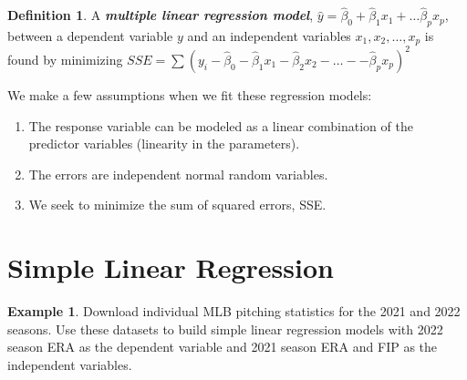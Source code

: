 \documentclass[
  11pt,
]{book}
\providecommand{\tightlist}{%
  \setlength{\itemsep}{0pt}\setlength{\parskip}{0pt}}
\theoremstyle{definition}
\newtheorem{definition}{Definition}[chapter]
\theoremstyle{definition}
\newtheorem{example}{Example}[chapter]
\theoremstyle{definition}
\theoremstyle{definition}
\theoremstyle{remark}
\begin{document}
\begin{definition}
A \textbf{\emph{multiple linear regression model}}, \(\hat{y} = \hat{\beta}_0 + \hat{\beta}_1 x_1 + \ldots \hat{\beta}_p x_p\), between a dependent variable \(y\) and an independent variables \(x_1, x_2, \ldots, x_p\) is found by minimizing \(SSE=\sum(y_i-\hat{\beta}_0-\hat{\beta}_1x_1-\hat{\beta}_2x_2- \ldots - -\hat{\beta}_px_p)^2\)\\

\end{definition}

We make a few assumptions when we fit these regression models:

\begin{enumerate}
\def\labelenumi{\arabic{enumi}.}
\tightlist
\item
  The response variable can be modeled as a linear combination of the predictor variables (linearity in the parameters).\\
\item
  The errors are independent normal random variables.\\
\item
  We seek to minimize the sum of squared errors, SSE.
\end{enumerate}

\newpage

\hypertarget{simple-linear-regression}{%
\section{Simple Linear Regression}\label{simple-linear-regression}}

\begin{example}
Download individual MLB pitching statistics for the 2021 and 2022 seasons. Use these datasets to build simple linear regression models with 2022 season ERA as the dependent variable and 2021 season ERA and FIP as the independent variables.
\end{example}
\end{document}
